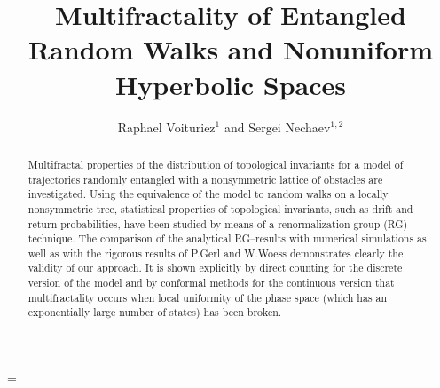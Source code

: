 
\hoffset=-0.25in
\textwidth=6.7in
\def\baselinestretch{1.15}
\parskip=\medskipamount


\def\be{\begin{equation}}
\def\ee{\end{equation}}
\def\disp{\displaystyle}
\def\foot{\footnotesize}
\def\scri{\scriptsize}
\def\R{{\sf I\kern-.15em R}}
\def\C{\kern.1em{\raise.47ex\hbox{$\scriptscriptstyle |$}}
             \kern-.40em{\sf C}}
\def\Z{{\sf Z\kern-.45em Z}}

\def\ze{\zeta}
\def\al{\alpha}




\title{Multifractality of Entangled  Random Walks and Nonuniform Hyperbolic Spaces}
\author{Raphael Voituriez$^{1}$ and Sergei Nechaev$^{1,2}$}
\address{$^{1}$Laboratoire de Physique Th\'eorique et Mod\`eles Statistiques, Universit\'e Paris Sud, \\ 91405 Orsay Cedex, France}
\address{$^{2}$L D Landau Institute for Theoretical Physics, 117940,
Moscow, Russia}
\maketitle
\bigskip

\begin{abstract}  Multifractal properties of the distribution of 
topological invariants for a model of trajectories randomly entangled with a
nonsymmetric lattice of obstacles are investigated. Using the equivalence of the model to  random walks on a locally nonsymmetric tree, statistical properties of topological invariants, such as drift and return probabilities,  have been studied by means of a renormalization group (RG)
technique. The comparison of the analytical RG--results with  numerical
simulations as well as with the rigorous results of P.Gerl and W.Woess
\cite{woess} demonstrates clearly the validity of our approach.  It is shown explicitly by
direct counting for the discrete version of the model and by conformal
methods for the continuous version that multifractality occurs when local uniformity of the phase space (which has an exponentially large number of states) has been broken.
\end{abstract}   \bigskip

